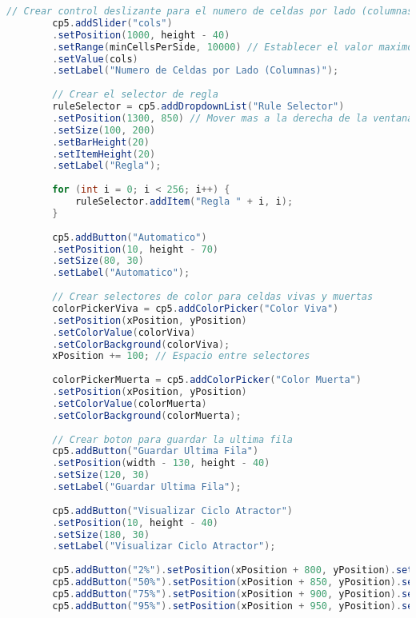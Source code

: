 \documentclass{article}
\begin{document}
\begin{lstlisting}[language=Java, basicstyle=\tiny, breaklines=true, breakatwhitespace=true]
		// Crear control deslizante para el numero de celdas por lado (columnas)
		cp5.addSlider("cols")
		.setPosition(1000, height - 40)
		.setRange(minCellsPerSide, 10000) // Establecer el valor maximo a 10000
		.setValue(cols)
		.setLabel("Numero de Celdas por Lado (Columnas)");
		
		// Crear el selector de regla
		ruleSelector = cp5.addDropdownList("Rule Selector")
		.setPosition(1300, 850) // Mover mas a la derecha de la ventana
		.setSize(100, 200)
		.setBarHeight(20)
		.setItemHeight(20)
		.setLabel("Regla");
		
		for (int i = 0; i < 256; i++) {
			ruleSelector.addItem("Regla " + i, i);
		}
		
		cp5.addButton("Automatico")
		.setPosition(10, height - 70)
		.setSize(80, 30)
		.setLabel("Automatico");
		
		// Crear selectores de color para celdas vivas y muertas
		colorPickerViva = cp5.addColorPicker("Color Viva")
		.setPosition(xPosition, yPosition)
		.setColorValue(colorViva)
		.setColorBackground(colorViva);
		xPosition += 100; // Espacio entre selectores
		
		colorPickerMuerta = cp5.addColorPicker("Color Muerta")
		.setPosition(xPosition, yPosition)
		.setColorValue(colorMuerta)
		.setColorBackground(colorMuerta);
		
		// Crear boton para guardar la ultima fila
		cp5.addButton("Guardar Ultima Fila")
		.setPosition(width - 130, height - 40)
		.setSize(120, 30)
		.setLabel("Guardar Ultima Fila");
		
		cp5.addButton("Visualizar Ciclo Atractor")
		.setPosition(10, height - 40)
		.setSize(180, 30)
		.setLabel("Visualizar Ciclo Atractor");
		
		cp5.addButton("2%").setPosition(xPosition + 800, yPosition).setSize(40, 30);
		cp5.addButton("50%").setPosition(xPosition + 850, yPosition).setSize(40, 30);
		cp5.addButton("75%").setPosition(xPosition + 900, yPosition).setSize(40, 30);
		cp5.addButton("95%").setPosition(xPosition + 950, yPosition).setSize(40, 30);
		

\end{lstlisting}
\end{document}
